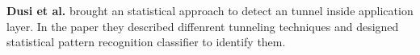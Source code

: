 \textbf{Dusi et al.} \cite{dusi2009tunnel} brought an statistical approach 
to detect an tunnel inside application layer.
In the paper they described diffenrent tunneling techniques and designed statistical pattern recognition 
classifier to identify them. 
%


